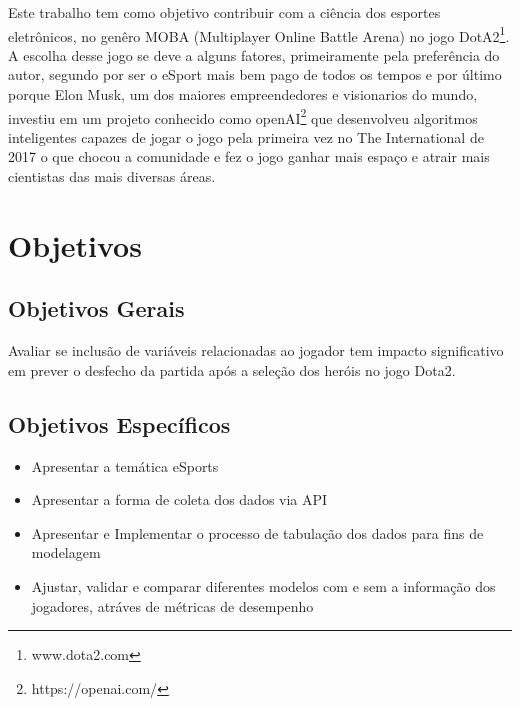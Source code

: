 \documentclass[
12pt,				%
openright,			%
oneside,			%
a4paper,			%
english,			%
brazil,				%
]{abntex2}
\begin{document}
Este trabalho tem como objetivo contribuir com a ciência dos esportes
eletrônicos, no genêro MOBA (Multiplayer Online Battle Arena) no jogo
DotA2\footnote{www.dota2.com}. A escolha desse jogo se deve a alguns fatores,
primeiramente pela preferência do autor, segundo por ser o eSport mais bem pago
de todos os tempos e por último porque Elon Musk, um dos maiores empreendedores
e visionarios do mundo, investiu em um projeto conhecido como
openAI\footnote{https://openai.com/} que desenvolveu algoritmos inteligentes
capazes de jogar o jogo pela primeira vez no The International de 2017 o que
chocou a comunidade e fez o jogo ganhar mais espaço e atrair mais cientistas das
mais diversas áreas.


\chapter{Objetivos}

\section{Objetivos Gerais}

Avaliar se inclusão de variáveis relacionadas ao jogador tem impacto
significativo em prever o desfecho da partida após a seleção dos heróis no
jogo Dota2.

\section{Objetivos Específicos}

\begin{itemize}
\item Apresentar a temática eSports

\item Apresentar a forma de coleta dos dados via API

\item Apresentar e Implementar o processo de tabulação dos dados para fins de
modelagem

\item Ajustar, validar e comparar diferentes modelos com e sem a informação dos
jogadores, atráves de métricas de desempenho

\end{itemize}
\end{document}
